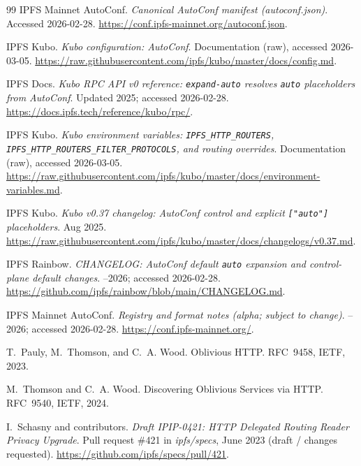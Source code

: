 \documentclass[11pt]{article}
\begin{document}
\begin{thebibliography}{99}
IPFS Mainnet AutoConf.
\newblock \emph{Canonical AutoConf manifest (autoconf.json)}.
\newblock Accessed 2026-02-28.
\newblock \url{https://conf.ipfs-mainnet.org/autoconf.json}.

IPFS Kubo.
\newblock \emph{Kubo configuration: AutoConf}.
\newblock Documentation (raw), accessed 2026-03-05.
\newblock \url{https://raw.githubusercontent.com/ipfs/kubo/master/docs/config.md}.


IPFS Docs.
\newblock \emph{Kubo RPC API v0 reference: \texttt{expand-auto} resolves \texttt{auto} placeholders from AutoConf}.
\newblock Updated 2025; accessed 2026-02-28.
\newblock \url{https://docs.ipfs.tech/reference/kubo/rpc/}.


IPFS Kubo.
\newblock \emph{Kubo environment variables: \texttt{IPFS\_HTTP\_ROUTERS}, \texttt{IPFS\_HTTP\_ROUTERS\_\allowbreak FILTER\_\allowbreak PROTOCOLS}, and routing overrides}.
\newblock Documentation (raw), accessed 2026-03-05.
\newblock \url{https://raw.githubusercontent.com/ipfs/kubo/master/docs/environment-variables.md}.


IPFS Kubo.
\newblock \emph{Kubo v0.37 changelog: AutoConf control and explicit \texttt{["auto"]} placeholders}.
 Aug 2025.
\newblock \url{https://raw.githubusercontent.com/ipfs/kubo/master/docs/changelogs/v0.37.md}.

IPFS Rainbow.
\newblock \emph{CHANGELOG: AutoConf default \texttt{auto} expansion and control-plane default changes}.
--2026; accessed 2026-02-28.
\newblock \url{https://github.com/ipfs/rainbow/blob/main/CHANGELOG.md}.


IPFS Mainnet AutoConf.
\newblock \emph{Registry and format notes (alpha; subject to change)}.
--2026; accessed 2026-02-28.
\newblock \url{https://conf.ipfs-mainnet.org/}.


T.~Pauly, M.~Thomson, and C.~A. Wood.
\newblock Oblivious HTTP.
\newblock RFC~9458, IETF, 2023.

M.~Thomson and C.~A. Wood.
\newblock Discovering Oblivious Services via HTTP.
\newblock RFC~9540, IETF, 2024.

I.~Schasny and contributors.
\newblock \emph{Draft IPIP-0421: HTTP Delegated Routing Reader Privacy Upgrade}.
\newblock Pull request \#421 in \emph{ipfs/specs}, June 2023 (draft / changes requested).
\newblock \url{https://github.com/ipfs/specs/pull/421}.



\end{thebibliography}
\end{document}
